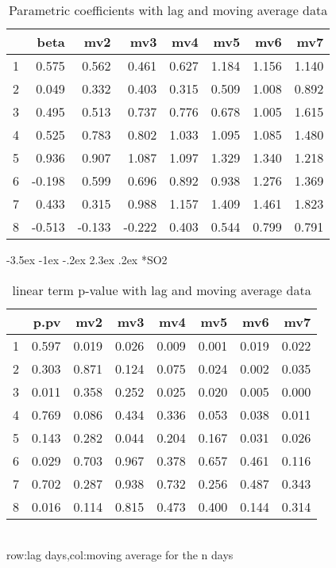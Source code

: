 \documentclass[a4paper, 12pt]{article}
\makeatletter
\def\large{\fontsize{14}{20}\selectfont}
\renewcommand\subsection{\@startsection {subsection}{1}{\z@}%
                                   {-3.5ex \@plus -1ex \@minus -.2ex}%
                                   {2.3ex \@plus.2ex}%
                                   {\centering\normalfont\large\bfseries}}
\makeatother
\begin{document}
\begin{table}[h]
\centering
\caption{Parametric coefficients with lag and moving average data}
\begin{tabular}{rrrrrrrr}
  \hline
 & beta & mv2 & mv3 & mv4 & mv5 & mv6 & mv7 \\
  \hline
1 & 0.575 & 0.562 & 0.461 & 0.627 & 1.184 & 1.156 & 1.140 \\
  2 & 0.049 & 0.332 & 0.403 & 0.315 & 0.509 & 1.008 & 0.892 \\
  3 & 0.495 & 0.513 & 0.737 & 0.776 & 0.678 & 1.005 & 1.615 \\
  4 & 0.525 & 0.783 & 0.802 & 1.033 & 1.095 & 1.085 & 1.480 \\
  5 & 0.936 & 0.907 & 1.087 & 1.097 & 1.329 & 1.340 & 1.218 \\
  6 & -0.198 & 0.599 & 0.696 & 0.892 & 0.938 & 1.276 & 1.369 \\
  7 & 0.433 & 0.315 & 0.988 & 1.157 & 1.409 & 1.461 & 1.823 \\
  8 & -0.513 & -0.133 & -0.222 & 0.403 & 0.544 & 0.799 & 0.791 \\
   \hline
\end{tabular}
\end{table}
\clearpage
\subsection*{SO2}
\begin{table}[h]
\centering
\caption{linear term p-value with lag and moving average data}
\begin{tabular}{rrrrrrrr}
  \hline
 & p.pv & mv2 & mv3 & mv4 & mv5 & mv6 & mv7 \\
  \hline
1 & 0.597 & 0.019 & 0.026 & 0.009 & 0.001 & 0.019 & 0.022 \\
  2 & 0.303 & 0.871 & 0.124 & 0.075 & 0.024 & 0.002 & 0.035 \\
  3 & 0.011 & 0.358 & 0.252 & 0.025 & 0.020 & 0.005 & 0.000 \\
  4 & 0.769 & 0.086 & 0.434 & 0.336 & 0.053 & 0.038 & 0.011 \\
  5 & 0.143 & 0.282 & 0.044 & 0.204 & 0.167 & 0.031 & 0.026 \\
  6 & 0.029 & 0.703 & 0.967 & 0.378 & 0.657 & 0.461 & 0.116 \\
  7 & 0.702 & 0.287 & 0.938 & 0.732 & 0.256 & 0.487 & 0.343 \\
  8 & 0.016 & 0.114 & 0.815 & 0.473 & 0.400 & 0.144 & 0.314 \\
   \hline
\end{tabular}
\\row:lag days,col:moving average for the n days
\end{table}
\end{document}
